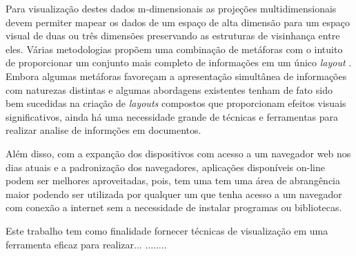 Para visualização destes dados m-dimensionais as projeções multidimensionais devem permiter mapear os dados de um espaço de alta dimensão para um espaço visual de duas ou três dimensões preservando as estruturas de visinhança entre eles. Várias metodologias propõem uma combinação de metáforas com o intuito de proporcionar um conjunto mais completo de informações em um único \textit{layout} \cite{pagliosa2013mist}.
 Embora algumas metáforas favoreçam a apresentação simultânea de informações com naturezas distintas e algumas abordagens existentes tenham de fato sido bem sucedidas na criação de \emph{layouts} compostos que proporcionam efeitos visuais significativos, ainda há uma necessidade grande de técnicas e ferramentas para realizar analise de informções em documentos.





 
Além disso, com a expanção dos dispositivos com acesso a um navegador web nos dias atuais e a padronização dos navegadores, aplicações disponíveis on-line podem ser melhores aproveitadas, pois, tem uma  tem uma área de abrangência maior podendo ser utilizada por qualquer um que tenha acesso a um navegador com conexão a internet sem a necessidade de instalar programas ou bibliotecas.
 
 Este trabalho tem como finalidade fornecer técnicas de visualização em uma ferramenta eficaz para realizar...
........

